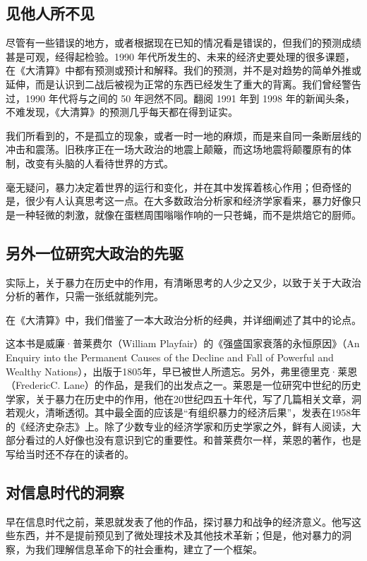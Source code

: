\subsection{见他人所不见}
尽管有一些错误的地方，或者根据现在已知的情况看是错误的，但我们的预测成绩甚是可观，经得起检验。1990 年代所发生的、未来的经济史要处理的很多课题，在《大清算》中都有预测或预计和解释。我们的预测，并不是对趋势的简单外推或延伸，而是认识到二战后被视为正常的东西已经发生了重大的背离。我们曾经警告过，1990 年代将与之间的 50 年迥然不同。翻阅 1991 年到 1998 年的新闻头条，不难发现，《大清算》的预测几乎每天都在得到证实。

我们所看到的，不是孤立的现象，或者一时一地的麻烦，而是来自同一条断层线的冲击和震荡。旧秩序正在一场大政治的地震上颠簸，而这场地震将颠覆原有的体制，改变有头脑的人看待世界的方式。

毫无疑问，暴力决定着世界的运行和变化，并在其中发挥着核心作用；但奇怪的是，很少有人认真思考这一点。在大多数政治分析家和经济学家看来，暴力好像只是一种轻微的刺激，就像在蛋糕周围嗡嗡作响的一只苍蝇，而不是烘焙它的厨师。


\subsection{另外一位研究大政治的先驱}
实际上，关于暴力在历史中的作用，有清晰思考的人少之又少，以致于关于大政治分析的著作，只需一张纸就能列完。


在《大清算》中，我们借鉴了一本大政治分析的经典，并详细阐述了其中的论点。


这本书是威廉·普莱费尔（William Playfair）的《强盛国家衰落的永恒原因》（An Enquiry into the Permanent Causes of the Decline and Fall of Powerful and Wealthy Nations），出版于1805年，早已被世人所遗忘。另外，弗里德里克·莱恩（FredericC. Lane）的作品，是我们的出发点之一。莱恩是一位研究中世纪的历史学家，关于暴力在历史中的作用，他在20世纪四五十年代，写了几篇相关文章，洞若观火，清晰透彻。其中最全面的应该是“有组织暴力的经济后果”，发表在1958年的《经济史杂志》上。除了少数专业的经济学家和历史学家之外，鲜有人阅读，大部分看过的人好像也没有意识到它的重要性。和普莱费尔一样，莱恩的著作，也是写给当时还不存在的读者的。


\subsection{对信息时代的洞察}
早在信息时代之前，莱恩就发表了他的作品，探讨暴力和战争的经济意义。他写这些东西，并不是提前预见到了微处理技术及其他技术革新；但是，他对暴力的洞察，为我们理解信息革命下的社会重构，建立了一个框架。


